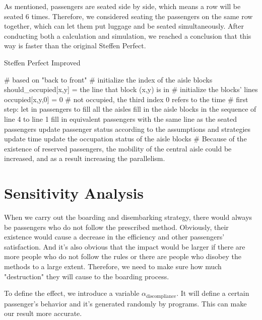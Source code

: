 \documentclass{article}
\theoremstyle{definition}
\theoremstyle{remark}
\numberwithin{equation}{section}
\begin{document}
	As mentioned, passengers are seated side by side, which means a row will be seated 6 times. Therefore, we considered seating the passengers on the same row together, which can let them put luggage and be seated simultaneously. After conducting both a calculation and simulation, we reached a conclusion that this way is faster than the original Steffen Perfect.

	\begin{algorithm}
		\caption{Steffen Perfect Improved}
		\begin{algorithmic}
			\STATE \# based on "back to front"
			\STATE \# initialize the index of the aisle blocks
			\STATE should\_occupied[x,y] = the line that block (x,y) is in \# initialize the blocks' lines
			\STATE occupied[x,y,0] = 0 \# not occupied, the third index 0 refers to the time
			\STATE \# first step: let in passengers to fill all the aisles
			\ENDFOR
			\STATE fill in the aisle blocks in the sequence of line 4 to line 1
			\ENDWHILE
			\STATE fill in equivalent passengers with the same line as the seated passengers
			\ENDIF
			\STATE update passenger status according to the assumptions and strategies
			\STATE update time
			\STATE update the occupation status of the aisle blocks
			\STATE \# Because of the existence of reserved passengers, the mobility of the central aisle could be increased, and as a result increasing the parallelism.
			\ENDWHILE
		\end{algorithmic}
	\end{algorithm}
	\section{Sensitivity Analysis}
	When we carry out the boarding and disembarking strategy, there would always be passengers who do not follow the prescribed method. Obviously, their existence would cause a decrease in the efficiency and other passengers' satisfaction. And it's also obvious that the impact would be larger if there are more people who do not follow the rules or there are people who disobey the methods to a large extent. Therefore, we need to make sure how much "destruction" they will cause to the boarding process.

	To define the effect, we introduce a variable $\alpha_\text{discompliance}$. It will define a certain passenger's behavior and it's generated randomly by programs. This can make our result more accurate.
\end{document}
